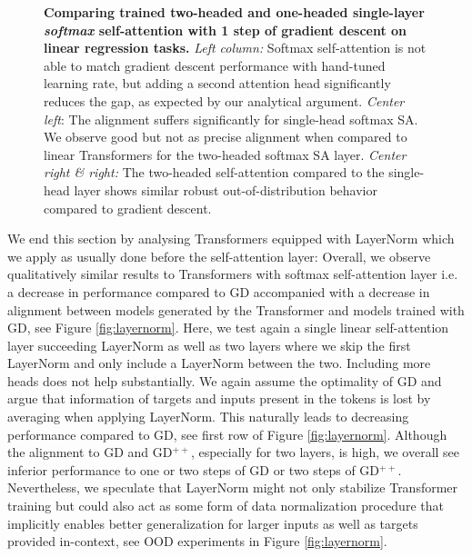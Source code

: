 \documentclass{article}
\theoremstyle{plain}
\theoremstyle{definition}
\theoremstyle{remark}
\begin{document}
\begin{figure}
\begin{center}
\begin{minipage}{.23\textwidth}
\begin{center}
  \end{center}
  \vspace{-10pt}
\end{minipage}
\end{center}
\vspace{-3pt}
  \caption{\textbf{Comparing trained two-headed and one-headed single-layer \textit{softmax} self-attention with 1 step of gradient descent on linear regression tasks.} \textit{Left column:} Softmax self-attention is not able to match gradient descent performance with hand-tuned learning rate, but adding a second attention head significantly reduces the gap, as expected by our analytical argument.  
  \textit{Center left}: The alignment suffers significantly for single-head softmax SA. We observe good but not as precise alignment when compared to linear Transformers for the two-headed softmax SA layer. \textit{Center right \& right:} The two-headed self-attention compared to the single-head layer shows similar robust out-of-distribution behavior compared to gradient descent.}
  \label{fig:softmax}
  \vspace{-10pt}
\end{figure}

We end this section by analysing Transformers equipped with LayerNorm which we apply as usually done before the self-attention layer: Overall, we observe qualitatively similar results to Transformers with softmax self-attention layer i.e. a decrease in performance compared to GD accompanied with a decrease in alignment between models generated by the Transformer and models trained with GD, see Figure \ref{fig:layernorm}.
Here, we test again a single linear self-attention layer succeeding LayerNorm as well as two layers where we skip the first LayerNorm and only include a LayerNorm between the two. Including more heads does not help substantially. 
We again assume the optimality of GD and argue that information of  targets and inputs present in the tokens is lost by averaging when applying LayerNorm. This naturally leads to decreasing performance compared to GD, see first row of Figure \ref{fig:layernorm}. Although the alignment to GD and GD$
^{++}$, especially for two layers, is high, we overall see inferior performance to one or two steps of GD or two steps of GD$^{++}$.
Nevertheless, we speculate that LayerNorm might not only stabilize Transformer training but could also act as some form of data normalization procedure that implicitly enables better generalization for larger inputs as well as targets provided in-context, see OOD experiments in Figure \ref{fig:layernorm}.
\end{document}
